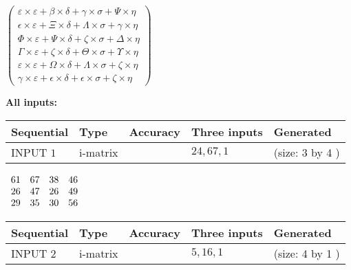 \documentclass[12pt]{article}
\begin{document}
   
 $   \left( \begin{array}
 {
 c
 }
 \varepsilon \times  \varepsilon   +  \beta \times  \delta   +  \gamma \times  \sigma   +  \Psi \times  \eta \\ 
 \epsilon \times  \varepsilon   +                     \Xi \times  \delta   +  \Lambda \times  \sigma   +  \gamma \times  \eta \\ 
 \Phi \times  \varepsilon   +  \Psi \times  \delta   +                     \zeta \times  \sigma   +  \Delta \times  \eta \\ 
 \Gamma \times  \varepsilon   +                     \zeta \times  \delta   +  \Theta \times  \sigma   +  \Upsilon \times  \eta \\ 
 \varepsilon \times  \varepsilon   +  \Omega \times  \delta   +  \Lambda \times  \sigma   +                     \zeta \times  \eta \\ 
 \gamma \times  \varepsilon   +  \epsilon \times  \delta   +  \epsilon \times  \sigma   +                     \zeta \times  \eta
 \end{array} \right) $ 
   
   
\noindent\vspace{0.1in}\hspace{-0.08in} {\textbf{\Large{All inputs: }}}
   
   
  
  
\noindent\begin{tabular}{|l|l|l|l|l|}
\hline
 Sequential & Type & Accuracy & Three inputs & Generated \\ 
\hline
 
 
  INPUT $  1 $ & i-matrix &  & $
 24
 , 
 67
 , 
 1
 $ & (size:  3  by  4 )
 \\  \hline  
 \end{tabular}
   
   
 $\begin{array}{
 c
 c
 c
 c
 }
 61  & 
 67  & 
 38  & 
 46  \\ 
 26  & 
 47  & 
 26  & 
 49  \\ 
 29  & 
 35  & 
 30  & 
 56
\end{array}  $ 
  
  
\noindent\begin{tabular}{|l|l|l|l|l|}
\hline
 Sequential & Type & Accuracy & Three inputs & Generated \\ 
\hline
 
 
  INPUT $  2 $ & i-matrix &  & $
 5
 , 
 16
 , 
 1
 $ & (size:  4  by  1 )
 \\  \hline  
 \end{tabular}
   
\end{document}
